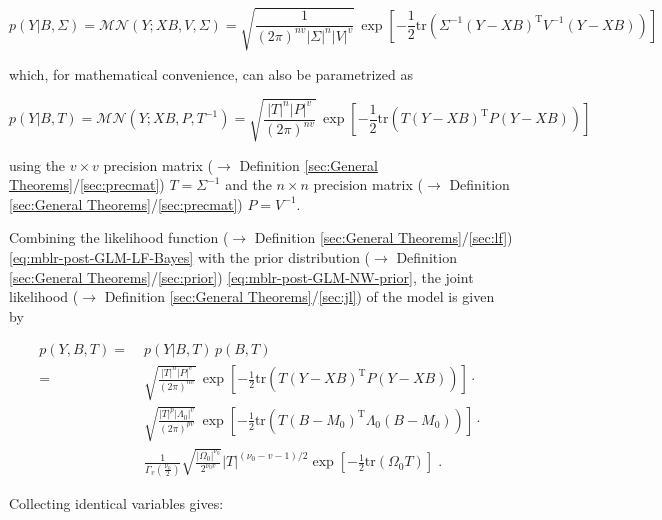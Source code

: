 \documentclass[a4paper,12pt,twoside]{book}
\begin{document}
\begin{equation} \label{eq:mblr-post-GLM-LF-Class}
p(Y|B,\Sigma) = \mathcal{MN}(Y; X B, V, \Sigma) = \sqrt{\frac{1}{(2 \pi)^{nv} |\Sigma|^n |V|^v}} \, \exp\left[ -\frac{1}{2} \mathrm{tr}\left( \Sigma^{-1} (Y-XB)^\mathrm{T} V^{-1} (Y-XB) \right) \right]
\end{equation}

which, for mathematical convenience, can also be parametrized as

\begin{equation} \label{eq:mblr-post-GLM-LF-Bayes}
p(Y|B,T) = \mathcal{MN}(Y; X B, P, T^{-1}) = \sqrt{\frac{|T|^n |P|^v}{(2 \pi)^{nv}}} \, \exp\left[ -\frac{1}{2} \mathrm{tr}\left( T (Y-XB)^\mathrm{T} P (Y-XB) \right) \right]
\end{equation}

using the $v \times v$ precision matrix ($\rightarrow$ Definition \ref{sec:General Theorems}/\ref{sec:precmat}) $T = \Sigma^{-1}$ and the $n \times n$ precision matrix ($\rightarrow$ Definition \ref{sec:General Theorems}/\ref{sec:precmat}) $P = V^{-1}$.

\vspace{1em}
Combining the likelihood function ($\rightarrow$ Definition \ref{sec:General Theorems}/\ref{sec:lf}) \eqref{eq:mblr-post-GLM-LF-Bayes} with the prior distribution ($\rightarrow$ Definition \ref{sec:General Theorems}/\ref{sec:prior}) \eqref{eq:mblr-post-GLM-NW-prior}, the joint likelihood ($\rightarrow$ Definition \ref{sec:General Theorems}/\ref{sec:jl}) of the model is given by

\begin{equation} \label{eq:mblr-post-GLM-NW-JL-s1}
\begin{split}
p(Y,B,T) = \; & p(Y|B,T) \, p(B,T) \\
= \; & \sqrt{\frac{|T|^n |P|^v}{(2 \pi)^{nv}}} \, \exp\left[ -\frac{1}{2} \mathrm{tr}\left( T (Y-XB)^\mathrm{T} P (Y-XB) \right) \right] \cdot \\
& \sqrt{\frac{|T|^p |\Lambda_0|^v}{(2 \pi)^{pv}}} \, \exp\left[ -\frac{1}{2} \mathrm{tr}\left( T (B-M_0)^\mathrm{T} \Lambda_0 (B-M_0) \right) \right] \cdot \\
& \frac{1}{\Gamma_v \left( \frac{\nu_0}{2} \right)} \sqrt{\frac{|\Omega_0|^{\nu_0}}{2^{\nu_0 v}}} |T|^{(\nu_0-v-1)/2} \exp\left[ -\frac{1}{2} \mathrm{tr}\left( \Omega_0 T \right) \right] \; .
\end{split}
\end{equation}

Collecting identical variables gives:
\end{document}
